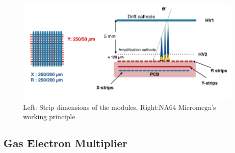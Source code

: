 \begin{figure}[t!]
\centering
\includegraphics[width=\textwidth]{thesis_figures/NA64_MM.png}
\caption{Left: Strip dimensions of the modules, Right:NA64 Micromega's working principle~\cite{Banerjee:2017mdu}}
\label{fig:Micromegas_na64}
\end{figure}

\subsection{Gas Electron Multiplier}
\label{sec:GEM}

